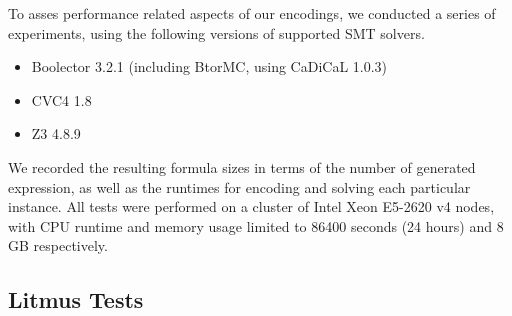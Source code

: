 To asses performance related aspects of our encodings,
we conducted a series of experiments, using the following versions of supported SMT solvers.
%
%
%
%
%
\begin{itemize}
  \item Boolector 3.2.1 (including BtorMC, using CaDiCaL 1.0.3) %
  \item CVC4 1.8 %
  \item Z3 4.8.9 %
\end{itemize}
%

We recorded the resulting formula sizes in terms of the number of generated expression, as well as the runtimes for encoding and solving each particular instance.
All tests were performed on a cluster of Intel\textsuperscript{\textregistered} Xeon\textsuperscript{\textregistered} E5-2620 v4 nodes, with CPU runtime and memory usage limited to 86400 seconds (24 hours) and 8 GB respectively.


\subsection*{Litmus Tests}

